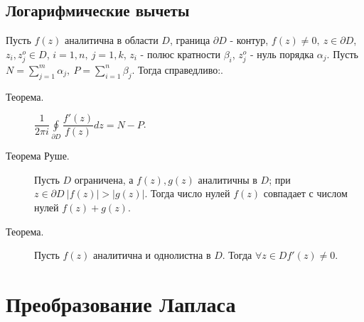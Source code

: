 \documentclass[a4paper,12pt]{scrartcl}
\begin{document}
\subsection{Логарифмические вычеты}

Пусть $f(z)$ аналитична в области $D$, граница $\partial D$ - контур, $f(z) \neq 0,\ z\in\partial D$, $z_i,z_j^o\in D$, $i=1,n,\ j=1,k$, $z_i$ - полюс кратности $\beta_i$, $z_j^o$ - нуль порядка $\alpha_j$. Пусть $N=\sum\limits_{j=1}^{m}\alpha_j,\ P=\sum\limits_{i=1}^{n}\beta_j$. Тогда справедливо:.
\begin{description}
 \item[Теорема.] $\dfrac{1}{2\pi i}\oint\limits_{\partial D}\dfrac{f'(z)}{f(z)}dz = N - P$.
 \item[Теорема Руше.] Пусть $D$ ограничена, а $f(z),g(z)$ аналитичны в $D$; при $z\in\partial D\ |f(z)| > |g(z)|$. Тогда число нулей $f(z)$ совпадает с числом нулей $f(z)+g(z)$.
\item[Теорема.] Пусть $f(z)$ аналитична и однолистна в $D$. Тогда $\forall z \in D f'(z) \neq 0.$
\end{description}
\section{Преобразование Лапласа}
\end{document}
